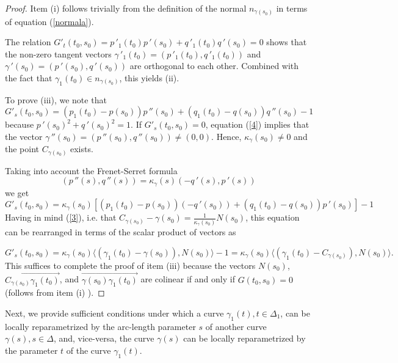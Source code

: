 \documentclass[a4paper,12pt]{amsart}
\def\g{\gamma}
\begin{document}
\begin{proof}
Item (i) follows trivially from
the definition of the normal $n_{\g(s_0)}$ in terms of equation (\ref{normala}).

The relation
$ G'_t(t_0,s_0)= p\,'_1(t_0)p\,'(s_0)+q\,'_1(t_0)q\,'(s_0)=0 $ shows that the non-zero tangent vectors
$\g\,'_1(t_0)=(p\,'_1 (t_0), q\,'_1(t_0))$ and
$\g\,'(s_0)=(p\,'(s_0), q\,'(s_0))$ are orthogonal to each other. Combined with the fact that $\g_1(t_0) \in n_{\g(s_0)}$, this yields (ii).

To prove (iii), we note that
\begin{equation}\label{4}
G'_s(t_0,s_0)=
(p_1(t_0)-p(s_0))p\,''(s_0)+(q_1(t_0)-q(s_0))q\,''(s_0)-1
\end{equation}
 because $p\,'(s_0)^2+ q\,'(s_0)^2=1$.
 If $G'_s(t_0,s_0)=0$, equation (\ref{4}) implies that the vector
 $\g\,''(s_0)=(p\,''(s_0), q\,''(s_0)) \neq (0,0)$.
 Hence,
 $\kappa_{\g}(s_0) \neq 0$ and the point $C_{\g(s_0)}$ exists.

Taking into account the Frenet-Serret formula
\begin{equation}\label{5}
(p\,''(s),q\,''(s)) = \kappa_{\g}(s)(-q\,'(s), p\,'(s))
\end{equation}
we get
\begin{equation}\label{6}
G'_s(t_0,s_0)=
\kappa_{\g}(s_0)[(p_1(t_0)-p(s_0))(-q\,'(s_0))+(q_1(t_0)-q(s_0))p\,'(s_0)]-1
\end{equation}
Having in mind (\ref{3}), i.e. that $C_{\g(s_0)} - \g(s_0) = \frac{1}{\kappa_{\g}(s_0)}N(s_0)$,
this equation can be rearranged in terms of the scalar product of vectors as

\begin{equation}\label{7}
G'_s(t_0,s_0)=\kappa_{\g}(s_0) \langle(\g_1(t_0) - \g(s_0)), N(s_0)\rangle - 1= \kappa_{\g}(s_0) \langle(\g_1(t_0) - C_{\g(s_0)}), N(s_0)\rangle.
\end{equation}
This suffices to complete the proof of item (iii) because the vectors $N(s_0)$, $\overrightarrow{C_{\g(s_0)}\g_1(t_0)}$, and
$\overrightarrow{\g(s_0)\g_1(t_0)}$ are colinear if and only if $G(t_0,s_0)=0$ (follows from item (i) ).
\end{proof}

Next, we provide sufficient conditions under which a curve
$\g_1(t), t \in \Delta_1$, can be locally reparametrized by the  arc-length parameter $s$ of another curve $\g(s), s \in \Delta$, and,
vice-versa, the curve $\g(s)$ can be locally reparametrized by the parameter $t$ of the curve $\g_1(t)$.
\end{document}
